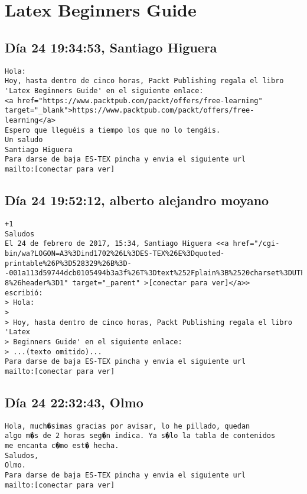 \documentclass[a4paper,10pt]{article}
\begin{document}
\section{Latex Beginners Guide}

\subsection{Día 24 19:34:53, Santiago Higuera}

\begin{lstlisting}
Hola:
Hoy, hasta dentro de cinco horas, Packt Publishing regala el libro 
'Latex Beginners Guide' en el siguiente enlace:
<a href="https://www.packtpub.com/packt/offers/free-learning" target="_blank">https://www.packtpub.com/packt/offers/free-learning</a>
Espero que lleguéis a tiempo los que no lo tengáis.
Un saludo
Santiago Higuera
Para darse de baja ES-TEX pincha y envia el siguiente url
mailto:[conectar para ver]

\end{lstlisting}

\subsection{Día 24 19:52:12, alberto alejandro moyano}

\begin{lstlisting}
+1
Saludos
El 24 de febrero de 2017, 15:34, Santiago Higuera <<a href="/cgi-bin/wa?LOGON=A3%3Dind1702%26L%3DES-TEX%26E%3Dquoted-printable%26P%3D528329%26B%3D--001a113d59744dcb0105494b3a3f%26T%3Dtext%252Fplain%3B%2520charset%3DUTF-8%26header%3D1" target="_parent" >[conectar para ver]</a>>
escribió:
> Hola:
>
> Hoy, hasta dentro de cinco horas, Packt Publishing regala el libro 'Latex
> Beginners Guide' en el siguiente enlace:
> ...(texto omitido)...
Para darse de baja ES-TEX pincha y envia el siguiente url
mailto:[conectar para ver]

\end{lstlisting}

\subsection{Día 24 22:32:43, Olmo}

\begin{lstlisting}
Hola, much�simas gracias por avisar, lo he pillado, quedan
algo m�s de 2 horas seg�n indica. Ya s�lo la tabla de contenidos
me encanta c�mo est� hecha.
Saludos,
Olmo.
Para darse de baja ES-TEX pincha y envia el siguiente url
mailto:[conectar para ver]

\end{lstlisting}
\end{document}

